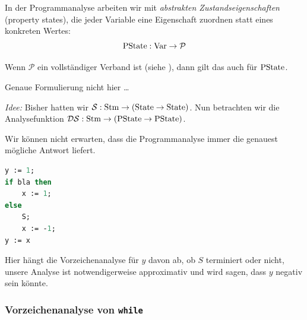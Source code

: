 In der Programmanalyse arbeiten wir mit \emph{abstrakten Zustandseigenschaften} (property states), die jeder Variable eine Eigenschaft zuordnen statt eines konkreten Wertes: \[
    \operatorname{PState}: \operatorname{Var} \to \mathcal{P}
\]

\begin{lemma}
    Wenn $\mathcal{P}$ ein vollständiger Verband ist (siehe ), dann gilt das auch für $\operatorname{PState}$.

    Genaue Formulierung nicht hier \dots
\end{lemma}

\par\bigskip
\emph{Idee:} Bisher hatten wir $\mathcal{S} : \operatorname{Stm} \to (\operatorname{State} \to \operatorname{State})$. Nun betrachten wir die Analysefunktion $\mathcal{DS}: \operatorname{Stm} \to (\operatorname{PState} \to \operatorname{PState})$.

\begin{remark}[Halteproblem]
    Wir können nicht erwarten, dass die Programmanalyse immer die genauest mögliche Antwort liefert.

\begin{lstlisting}[language=Pascal]
y := 1;
if bla then
    x := 1;
else
    S;
    x := -1;
y := x
\end{lstlisting}

    Hier hängt die Vorzeichenanalyse für $y$ davon ab, ob $S$ terminiert oder nicht, \dh{} unsere Analyse ist notwendigerweise approximativ und wird sagen, dass $y$ negativ sein könnte.
\end{remark}



\subsubsection{Vorzeichenanalyse von \texttt{while}}

